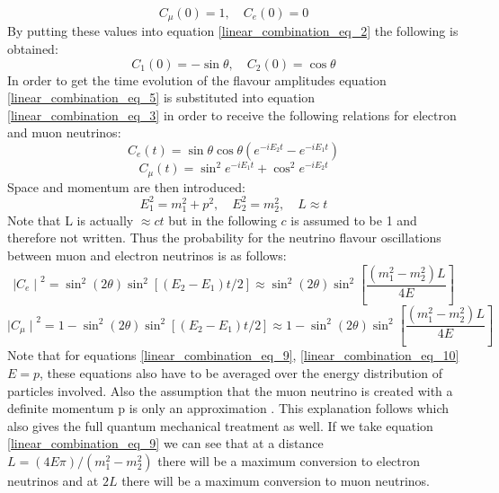 \begin{equation}
    C_\mu(0) = 1, \quad C_e(0) = 0
    \label{linear_combination_eq_4}
\end{equation}
By putting these values into equation \ref{linear_combination_eq_2} the following is obtained:
\begin{equation}
    C_1(0) = -\sin\theta, \quad C_2(0) = \cos\theta
    \label{linear_combination_eq_5}
\end{equation}
In order to get the time evolution of the flavour amplitudes equation \ref{linear_combination_eq_5} is substituted into equation \ref{linear_combination_eq_3} in order to receive the following relations for electron and muon neutrinos: 
\begin{equation}
    C_e(t)=\sin\theta\cos\theta(e^{-iE_2t}-e^{-iE_1t})
    \label{linear_combination_eq_6}
\end{equation}
\begin{equation}
    C_\mu(t)=\sin^{2}e^{-iE_1t} + \cos^{2}e^{-iE_2t}
    \label{linear_combination_eq_7}
\end{equation}
Space and momentum are then introduced: 
\begin{equation}
   E_1^2=m_1^2 + p^2, \quad E_2^2=m_2^2  , \quad L \approx t
    \label{linear_combination_eq_8}
\end{equation}
Note that L is actually $\approx ct$ but in the following $c$ is assumed to be 1 and therefore not written. Thus the probability for the neutrino flavour oscillations between muon and electron neutrinos is as follows: 
\begin{equation}
   {\mid{C_e}\mid}^2 = \sin^2(2\theta)\sin^2[(E_2-E_1)t/2] \approx \sin^2(2\theta)\sin^2\left[\frac{(m_1^2-m_2^2)L}{4E}\right]
    \label{linear_combination_eq_9}
\end{equation}
\begin{equation}
    {\mid{C_\mu}\mid}^2 = 1 - \sin^2(2\theta)\sin^2[(E_2-E_1)t/2] \approx 1 - \sin^2(2\theta)\sin^2\left[\frac{(m_1^2-m_2^2)L}{4E}\right]
    \label{linear_combination_eq_10}
\end{equation}
Note that for equations \ref{linear_combination_eq_9}, \ref{linear_combination_eq_10} $E = p$, these equations also have to be averaged over the energy distribution of particles involved. Also the assumption that the muon neutrino is created with a definite momentum p is only an approximation \cite{sassaroli1999neutrino}. This explanation follows \cite{sassaroli1999neutrino} which also gives the full quantum mechanical treatment as well. If we take equation \ref{linear_combination_eq_9} we can see that at a distance $L = (4E\pi) / (m_1^2 - m_2^2)$ there will be a maximum conversion to electron neutrinos and at $2L$ there will be a maximum conversion to muon neutrinos. 

